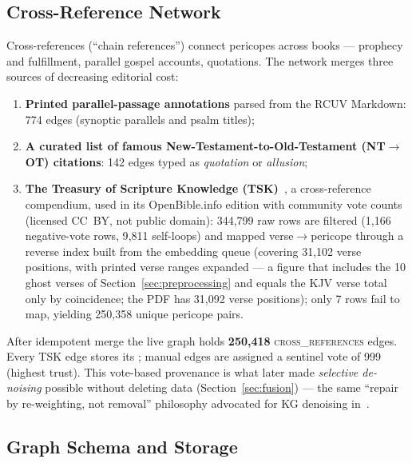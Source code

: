 \subsection{Cross-Reference Network}
\label{sec:crossrefs}

Cross-references (``chain references'') connect pericopes across books
--- prophecy and fulfillment, parallel gospel accounts, quotations. The
network merges three sources of decreasing editorial cost:

\begin{enumerate}
\item \textbf{Printed parallel-passage annotations} parsed from the RCUV
Markdown: 774 edges (synoptic parallels and psalm titles);
\item \textbf{A curated list of famous New-Testament-to-Old-Testament
(NT$\to$OT) citations}: 142 edges typed as \emph{quotation} or
\emph{allusion};
\item \textbf{The Treasury of Scripture Knowledge (TSK)}~\cite{tsk}, a
cross-reference compendium, used in its OpenBible.info edition with
community vote counts (licensed CC~BY, not public domain):
344{,}799 raw rows are filtered (1{,}166 negative-vote rows, 9{,}811
self-loops) and mapped verse$\to$pericope through a reverse index built
from the embedding queue (covering 31{,}102 verse positions, with printed
verse ranges expanded --- a figure that includes the 10 ghost verses of
Section~\ref{sec:preprocessing} and equals the KJV verse total only by
coincidence; the PDF has 31{,}092 verse positions); only 7 rows fail to
map, yielding 250{,}358 unique pericope pairs.
\end{enumerate}

After idempotent merge the live graph holds \textbf{250{,}418}
\textsc{cross\_references} edges. Every TSK edge stores its ;
manual edges are assigned a sentinel vote of 999 (highest trust). This
vote-based provenance is what later made \emph{selective de-noising}
possible without deleting data (Section~\ref{sec:fusion}) --- the same
``repair by re-weighting, not removal'' philosophy advocated for KG
denoising in~\cite{zheng2025lessismore}.

\subsection{Graph Schema and Storage}
\label{sec:schema}

